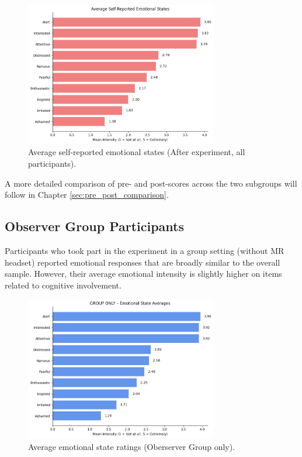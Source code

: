 \begin{figure}[htbp]
    \centering
    \includegraphics[width=0.75\textwidth]{../../Figures/emotional-post-all.png}
    \caption{Average self-reported emotional states (After experiment, all participants).}
    \label{fig:emotional_post_all}
\end{figure}

A more detailed comparison of pre- and post-scores across the two subgroups will follow in Chapter \ref{sec:pre_post_comparison}.

\subsection{Observer Group Participants}

Participants who took part in the experiment in a group setting (without MR headset) reported emotional responses that are broadly similar to the overall sample. However, their average emotional intensity is slightly higher on items related to cognitive involvement.

\begin{figure}[htbp]
    \centering
    \includegraphics[width=0.75\textwidth]{../../Figures/emotional-post-grp.png}
    \caption{Average emotional state ratings (Oberserver Group only).}
    \label{fig:emotional_post_group}
\end{figure}

